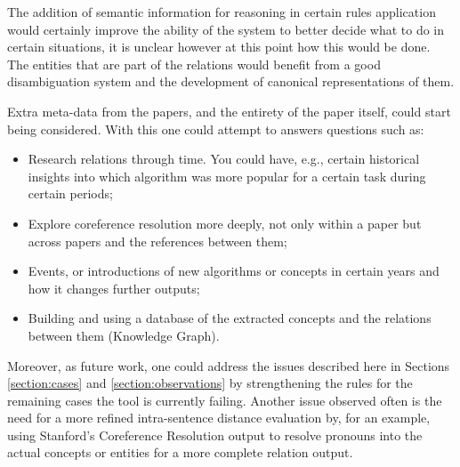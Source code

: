 \documentclass[11pt,a4paper,openright]{memoir}
\begin{document}
The addition of semantic information for reasoning in certain rules application would certainly improve the ability of the system to better decide what to do in certain situations, it is unclear however at this point how this would be done. The entities that are part of the relations would benefit from a good disambiguation system and the development of canonical representations of them.

Extra meta-data from the papers, and the entirety of the paper itself, could start being considered. With this one could attempt to answers questions such as:
	\begin{itemize}
	  \item Research relations through time. You could have, e.g., certain historical insights into which algorithm was more popular for a certain task during certain periods;
	  \item Explore coreference resolution more deeply, not only within a paper but across papers and the references between them;
	  \item Events, or introductions of new algorithms or concepts in certain years and how it changes further outputs;
	  \item Building and using a database of the extracted concepts and the relations between them (Knowledge Graph).
	\end{itemize}

Moreover, as future work, one could address the issues described here in Sections \ref{section:cases} and \ref{section:observations} by strengthening the rules for the remaining cases the tool is currently failing. Another issue observed often is the need for a more refined intra-sentence distance evaluation by, for an example, using Stanford's Coreference Resolution output to resolve pronouns into the actual concepts or entities for a more complete relation output.


\backmatter

\printbibliography

\appendix
\end{document}
